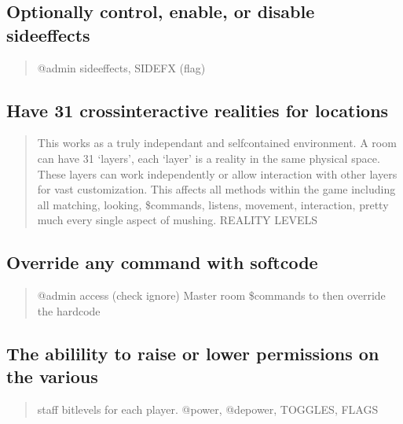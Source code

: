 \documentclass[letterpaper,10pt,english]{sphinxmanual}
\begin{document}
\subsection{Optionally control, enable, or disable sideeffects}
\label{\detokenize{features:optionally-control-enable-or-disable-sideeffects}}\begin{quote}

\sphinxAtStartPar
@admin sideeffects, SIDEFX (flag)
\end{quote}


\subsection{Have 31 cross\sphinxhyphen{}interactive realities for locations}
\label{\detokenize{features:have-31-cross-interactive-realities-for-locations}}\begin{quote}

\sphinxAtStartPar
This works as a truly independant and self\sphinxhyphen{}contained environment.
A room can have 31 ‘layers’, each ‘layer’ is a reality in
the same physical space.  These layers can work independently
or allow interaction with other layers for vast customization.
This affects all methods within the game including all matching,
looking, \$commands, listens, movement, interaction, pretty
much every single aspect of mushing.
REALITY LEVELS
\end{quote}


\subsection{Override any command with softcode}
\label{\detokenize{features:override-any-command-with-softcode}}\begin{quote}

\sphinxAtStartPar
@admin access (check ignore)
Master room \$commands to then override the hardcode
\end{quote}


\subsection{The abilility to raise or lower permissions on the various}
\label{\detokenize{features:the-abilility-to-raise-or-lower-permissions-on-the-various}}\begin{quote}

\sphinxAtStartPar
staff bitlevels for each player.
@power, @depower, TOGGLES, FLAGS
\end{quote}
\end{document}
